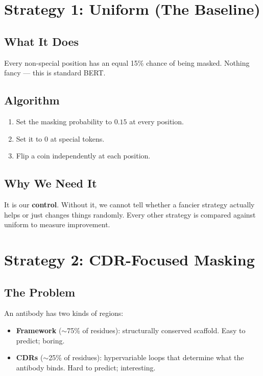 \documentclass[11pt]{article}
\begin{document}
\section{Strategy 1: Uniform (The Baseline)}
\label{sec:uniform}

\subsection{What It Does}
Every non-special position has an equal 15\% chance of being masked.
Nothing fancy --- this is standard BERT.

\subsection{Algorithm}
\begin{enumerate}
\item Set the masking probability to $0.15$ at every position.
\item Set it to $0$ at special tokens.
\item Flip a coin independently at each position.
\end{enumerate}

\subsection{Why We Need It}
It is our \textbf{control}. Without it, we cannot tell whether a
fancier strategy actually helps or just changes things randomly. Every
other strategy is compared against uniform to measure improvement.

\section{Strategy 2: CDR-Focused Masking}
\label{sec:cdr}

\subsection{The Problem}
An antibody has two kinds of regions:
\begin{itemize}
\item \textbf{Framework} ($\sim$75\% of residues): structurally
      conserved scaffold. Easy to predict; boring.
\item \textbf{CDRs} ($\sim$25\% of residues): hypervariable loops
      that determine what the antibody binds. Hard to predict;
      interesting.
\end{itemize}
\end{document}

